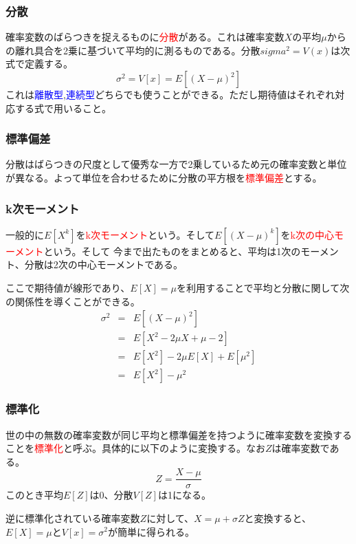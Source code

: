 \documentclass[a4paper,10pt]{jarticle}
\begin{document}
\subsubsection{分散}
確率変数のばらつきを捉えるものに\textcolor{red}{分散}がある。これは確率変数$X$の平均$\mu$からの離れ具合を2乗に基づいて平均的に測るものである。分散$sigma^2=V(x)$は次式で定義する。
\begin{equation}
    \sigma^2=V[x]=E[(X-\mu)^2]\tag{2,12}
\end{equation}
これは\textcolor{blue}{離散型},\textcolor{blue}{連続型}どちらでも使うことができる。ただし期待値はそれぞれ対応する式で用いること。

\subsubsection{標準偏差}
分散はばらつきの尺度として優秀な一方で2乗しているため元の確率変数と単位が異なる。よって単位を合わせるために分散の平方根を\textcolor{red}{標準偏差}とする。
\subsubsection{k次モーメント}
一般的に$E[X^k]$を\textcolor{red}{k次モーメント}という。そして$E[(X-\mu)^k]$を\textcolor{red}{k次の中心モーメント}という。そして
今まで出たものをまとめると、平均は1次のモーメント、分散は2次の中心モーメントである。

ここで期待値が線形であり、$E[X]=\mu$を利用することで平均と分散に関して次の関係性を導くことができる。
\begin{eqnarray*}
    \sigma^2 &=& E[(X-\mu)^2]\\
    &=& E[X^2-2\mu X +\mu-2]\\
    &=& E[X^2]-2\mu E[X]+E[\mu^2]\\
    &=& E[X^2]-\mu^2
\end{eqnarray*}
\subsubsection{標準化}
世の中の無数の確率変数が同じ平均と標準偏差を持つように確率変数を変換することを\textcolor{red}{標準化}と呼ぶ。具体的に以下のように変換する。なお$Z$は確率変数である。
\begin{equation}
    Z=\frac{X-\mu}{\sigma}\tag{2,13}
\end{equation}
このとき平均$E[Z]$は0、分散$V[Z]$は1になる。

逆に標準化されている確率変数$Z$に対して、$X=\mu+\sigma Z$と変換すると、$E[X]=\mu$と$V[x]=\sigma^2$が簡単に得られる。
\end{document}
